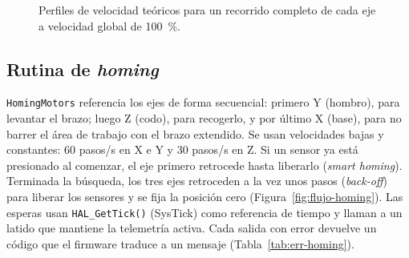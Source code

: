 \begin{figure}[!htbp]
\centering
{}
\caption{Perfiles de velocidad teóricos para un recorrido completo de cada eje a velocidad global de 100~\%.}\label{fig:rampa}
\end{figure}

\subsection{Rutina de \emph{homing}}\label{sec:prog-homing}
\texttt{HomingMotors} referencia los ejes de forma secuencial: primero Y (hombro), para
levantar el brazo; luego Z (codo), para recogerlo, y por último X (base), para no barrer el
área de trabajo con el brazo extendido. Se usan velocidades bajas y constantes: 60 pasos/s en
X e Y y 30 pasos/s en Z. Si un sensor ya está presionado al comenzar, el eje primero retrocede
hasta liberarlo (\emph{smart homing}). Terminada la búsqueda, los tres ejes retroceden a la
vez unos pasos (\emph{back-off}) para liberar los sensores y se fija la posición cero
(Figura~\ref{fig:flujo-homing}). Las esperas usan \texttt{HAL\_GetTick()} (SysTick) como
referencia de tiempo y llaman a un latido que mantiene la telemetría activa. Cada salida con
error devuelve un código que el firmware traduce a un mensaje (Tabla~\ref{tab:err-homing}).

